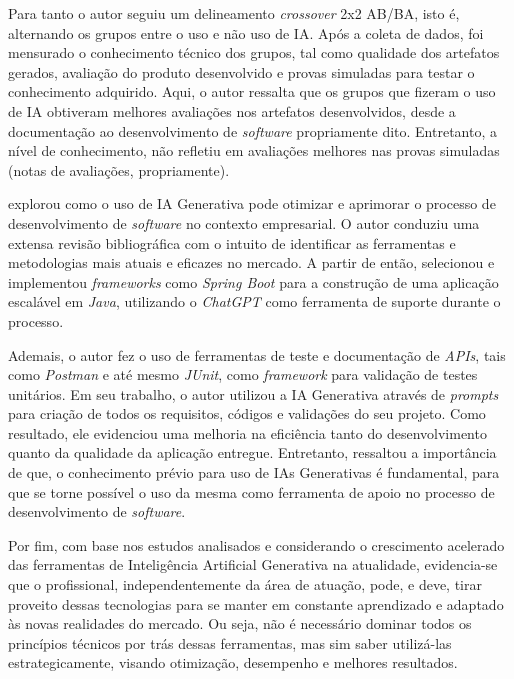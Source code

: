 \documentclass[english,brazilian]{UNISINOSartigo} %
\begin{document}
Para tanto o autor \cite{santos2024} seguiu um delineamento \textit{crossover} 2x2 AB/BA, isto é, alternando os grupos entre o uso e não uso de IA. Após a coleta de dados, foi mensurado o conhecimento técnico dos grupos, tal como qualidade dos artefatos gerados, avaliação do produto desenvolvido e provas simuladas para testar o conhecimento adquirido. Aqui, o autor ressalta que os grupos que fizeram o uso de IA obtiveram melhores avaliações nos artefatos desenvolvidos, desde a documentação ao desenvolvimento de \textit{software} propriamente dito. Entretanto, a nível de conhecimento, não refletiu em avaliações melhores nas provas simuladas (notas de avaliações, propriamente).

 explorou como o uso de IA Generativa pode otimizar e aprimorar o processo de desenvolvimento de \textit{software} no contexto empresarial. O autor conduziu uma extensa revisão bibliográfica com o intuito de identificar as ferramentas e metodologias mais atuais e eficazes no mercado. A partir de então, selecionou e implementou \textit{frameworks} como \textit{Spring Boot} para a construção de uma aplicação escalável em \textit{Java}, utilizando o \textit{ChatGPT} como ferramenta de suporte durante o processo.

Ademais, o autor \cite{costa2024} fez o uso de ferramentas de teste e documentação de \textit{APIs}, tais como \textit{Postman} e até mesmo \textit{JUnit}, como \textit{framework} para validação de testes unitários. Em seu trabalho, o autor utilizou a IA Generativa através de \textit{prompts} para criação de todos os requisitos, códigos e validações do seu projeto. Como resultado, ele evidenciou uma melhoria na eficiência tanto do desenvolvimento quanto da qualidade da aplicação entregue. Entretanto, ressaltou a importância de que, o conhecimento prévio para uso de IAs Generativas é fundamental, para que se torne possível o uso da mesma como ferramenta de apoio no processo de desenvolvimento de \textit{software}.

Por fim, com base nos estudos analisados e considerando o crescimento acelerado das ferramentas de Inteligência Artificial Generativa na atualidade, evidencia-se que o profissional, independentemente da área de atuação, pode, e deve, tirar proveito dessas tecnologias para se manter em constante aprendizado e adaptado às novas realidades do mercado. Ou seja, não é necessário dominar todos os princípios técnicos por trás dessas ferramentas, mas sim saber utilizá-las estrategicamente, visando otimização, desempenho e melhores resultados.
\end{document}
